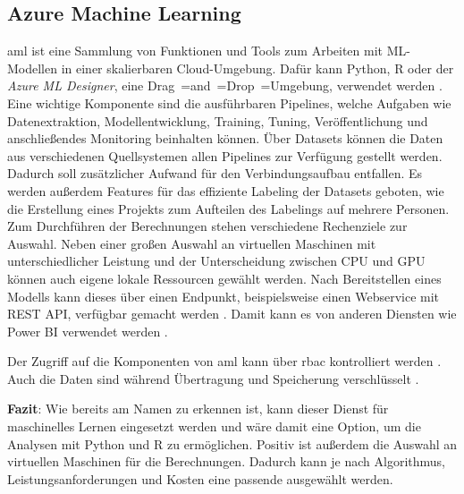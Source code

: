 \subsection{Azure Machine Learning} \label{sec:grundlagen:azure_dienste:machineLearning}
\ac{aml} ist eine Sammlung von Funktionen und Tools zum Arbeiten mit ML-Modellen in einer skalierbaren Cloud-Umgebung. Dafür kann Python, R oder der \textit{Azure ML Designer}, eine Drag~=and~=Drop~=Umgebung, verwendet werden \cite{soh_data_2020}. Eine wichtige Komponente sind die ausführbaren Pipelines, welche Aufgaben wie Datenextraktion, Modellentwicklung, Training, Tuning, Veröffentlichung und anschließendes Monitoring beinhalten können. Über Datasets können die Daten aus verschiedenen Quellsystemen allen Pipelines zur Verfügung gestellt werden. Dadurch soll zusätzlicher Aufwand für den Verbindungsaufbau entfallen. Es werden außerdem Features für das effiziente Labeling der Datasets geboten, wie die Erstellung eines Projekts zum Aufteilen des Labelings auf mehrere Personen. Zum Durchführen der Berechnungen stehen verschiedene Rechenziele zur Auswahl. Neben einer großen Auswahl an virtuellen Maschinen mit unterschiedlicher Leistung und der Unterscheidung zwischen CPU und GPU können auch eigene lokale Ressourcen gewählt werden. Nach Bereitstellen eines Modells kann dieses über einen Endpunkt, beispielsweise einen Webservice mit REST API, verfügbar gemacht werden \cite{price_azure_2021}. Damit kann es von anderen Diensten wie Power BI verwendet werden \cite{kemp_tutorial_2021}.

Der Zugriff auf die Komponenten von \ac{aml} kann über \ac{rbac} kontrolliert werden \cite{wu_manage_2021}. Auch die Daten sind während Übertragung und Speicherung verschlüsselt \cite{hirono_data_2021}.

\textbf{Fazit}: Wie bereits am Namen zu erkennen ist, kann dieser Dienst für maschinelles Lernen eingesetzt werden und wäre damit eine Option, um die Analysen mit Python und R zu ermöglichen. Positiv ist außerdem die Auswahl an virtuellen Maschinen für die Berechnungen. Dadurch kann je nach Algorithmus, Leistungsanforderungen und Kosten eine passende ausgewählt werden.



